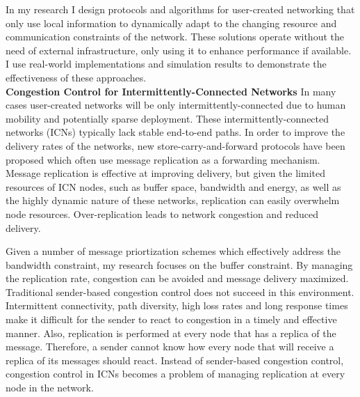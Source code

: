 \documentclass[10pt]{article}
\begin{document}
In my research I design protocols and algorithms for user-created networking
that only use local
information to dynamically adapt to the changing resource and communication
constraints of the network.  These solutions operate without the need of
external infrastructure, only using it to enhance performance if available.
I use real-world implementations and simulation results to demonstrate the
effectiveness of these approaches. \\



\noindent \textbf{Congestion Control for Intermittently-Connected Networks}
In many cases user-created networks will be only intermittently-connected due to
human mobility and potentially sparse deployment.
These intermittently-connected networks (ICNs)
typically lack stable end-to-end paths.  
In order to improve the
delivery rates of the networks, new store-carry-and-forward protocols have been
proposed which often use message replication as a forwarding mechanism.  
Message
replication is effective at improving delivery, but given the limited
resources of ICN nodes, such as buffer space, bandwidth and energy, as well as
the highly dynamic nature of these networks, replication can easily overwhelm
node resources.  Over-replication leads to network congestion and reduced
delivery.  

Given a number of message priortization schemes which effectively address the
bandwidth constraint, my research focuses on the buffer constraint.  By managing
the replication rate, congestion can be avoided and message delivery maximized.
Traditional sender-based congestion control does not succeed in this
environment.  Intermittent
connectivity, path diversity, high loss rates and long response times
make it difficult for the sender to react to congestion in a timely
and effective manner.  Also, replication is performed at every node
that has a replica of the message.  Therefore, a sender cannot know
how every node that will receive a replica of its messages should
react.  
Instead of sender-based congestion control, congestion control in ICNs
becomes a problem of managing replication at every node in the
network.
\end{document}
